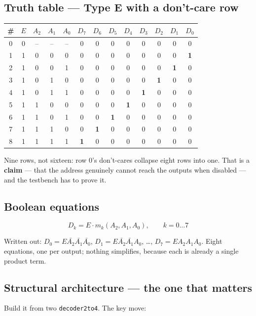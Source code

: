 \documentclass[11pt]{article}
\newcommand{\code}[1]{\texttt{#1}}
\begin{document}
\subsection*{Truth table --- Type E with a don't-care row}

\begin{center}
\begin{tabular}{c|cccc|cccccccc}
\toprule
\# & $E$ & $A_2$ & $A_1$ & $A_0$ & $D_7$ & $D_6$ & $D_5$ & $D_4$ & $D_3$ & $D_2$ & $D_1$ & $D_0$ \\
\midrule
0 & 0 & -- & -- & -- & 0&0&0&0&0&0&0&0 \\
1 & 1 & 0&0&0 & 0&0&0&0&0&0&0&\textbf{1} \\
2 & 1 & 0&0&1 & 0&0&0&0&0&0&\textbf{1}&0 \\
3 & 1 & 0&1&0 & 0&0&0&0&0&\textbf{1}&0&0 \\
4 & 1 & 0&1&1 & 0&0&0&0&\textbf{1}&0&0&0 \\
5 & 1 & 1&0&0 & 0&0&0&\textbf{1}&0&0&0&0 \\
6 & 1 & 1&0&1 & 0&0&\textbf{1}&0&0&0&0&0 \\
7 & 1 & 1&1&0 & 0&\textbf{1}&0&0&0&0&0&0 \\
8 & 1 & 1&1&1 & \textbf{1}&0&0&0&0&0&0&0 \\
\bottomrule
\end{tabular}
\end{center}

Nine rows, not sixteen: row 0's don't-cares collapse eight rows into one. That is a
\textbf{claim} --- that the address genuinely cannot reach the outputs when
disabled --- and the testbench has to prove it.

\subsection*{Boolean equations}

\[
D_k = E \cdot m_k(A_2,A_1,A_0), \qquad k = 0 \ldots 7
\]

Written out: $D_0 = E\bar{A_2}\bar{A_1}\bar{A_0}$, $D_1 = E\bar{A_2}\bar{A_1}A_0$,
\ldots, $D_7 = EA_2A_1A_0$. Eight equations, one per output; nothing simplifies,
because each is already a single product term.

\subsection*{Structural architecture --- the one that matters}

Build it from two \code{decoder2to4}. The key move:
\end{document}
